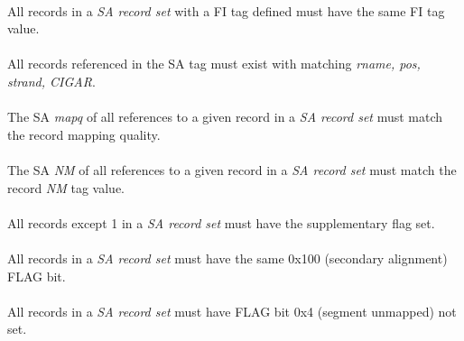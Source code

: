 \documentclass[10pt]{article}
\begin{document}
\paragraph{}

All records in a \textit{SA record set} with a FI tag defined must have the same FI tag value.

\paragraph{}

All records referenced in the SA tag must exist with matching \textit{rname, pos, strand, CIGAR}.

\paragraph{}

The SA \textit{mapq} of all references to a given record in a \textit{SA record set} must
match the record mapping quality.

\paragraph{}

The SA \textit{NM} of all references to a given record in a \textit{SA record set} must
match the record \textit{NM} tag value.

\paragraph{}

All records except 1 in a \textit{SA record set} must have the supplementary flag set.

\paragraph{}

All records in a \textit{SA record set} must have the same 0x100 (secondary alignment) FLAG bit.

\paragraph{}

All records in a \textit{SA record set} must have FLAG bit 0x4 (segment unmapped) not set.

\paragraph{}
\end{document}
